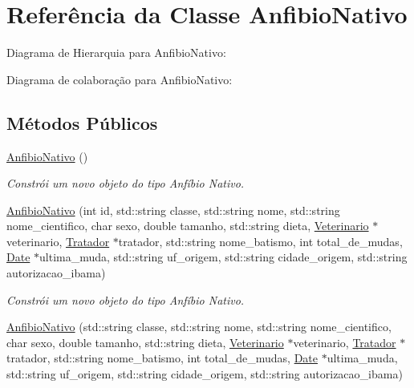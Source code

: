 \hypertarget{classAnfibioNativo}{}\section{Referência da Classe Anfibio\+Nativo}
\label{classAnfibioNativo}


Diagrama de Hierarquia para Anfibio\+Nativo\+:


Diagrama de colaboração para Anfibio\+Nativo\+:
\subsection*{Métodos Públicos}
\begin{DoxyCompactItemize}
\item 
\mbox{\label{classAnfibioNativo_a469824d5a99c24f0e5867c3b7e33cc6d}} 
\hyperlink{classAnfibioNativo_a469824d5a99c24f0e5867c3b7e33cc6d}{Anfibio\+Nativo} ()
\begin{DoxyCompactList}\small\item\em Constrói um novo objeto do tipo Anfíbio Nativo. \end{DoxyCompactList}\item 
\hyperlink{classAnfibioNativo_aea42e00a0890c29e8ba0ded0f280f3be}{Anfibio\+Nativo} (int id, std\+::string classe, std\+::string nome, std\+::string nome\+\_\+cientifico, char sexo, double tamanho, std\+::string dieta, \hyperlink{classVeterinario}{Veterinario} $\ast$veterinario, \hyperlink{classTratador}{Tratador} $\ast$tratador, std\+::string nome\+\_\+batismo, int total\+\_\+de\+\_\+mudas, \hyperlink{classDate}{Date} $\ast$ultima\+\_\+muda, std\+::string uf\+\_\+origem, std\+::string cidade\+\_\+origem, std\+::string autorizacao\+\_\+ibama)
\begin{DoxyCompactList}\small\item\em Constrói um novo objeto do tipo Anfíbio Nativo. \end{DoxyCompactList}\item 
\hyperlink{classAnfibioNativo_a892a98c092deab46c55d1fdcade4caf4}{Anfibio\+Nativo} (std\+::string classe, std\+::string nome, std\+::string nome\+\_\+cientifico, char sexo, double tamanho, std\+::string dieta, \hyperlink{classVeterinario}{Veterinario} $\ast$veterinario, \hyperlink{classTratador}{Tratador} $\ast$tratador, std\+::string nome\+\_\+batismo, int total\+\_\+de\+\_\+mudas, \hyperlink{classDate}{Date} $\ast$ultima\+\_\+muda, std\+::string uf\+\_\+origem, std\+::string cidade\+\_\+origem, std\+::string autorizacao\+\_\+ibama)

\end{DoxyCompactItemize}
